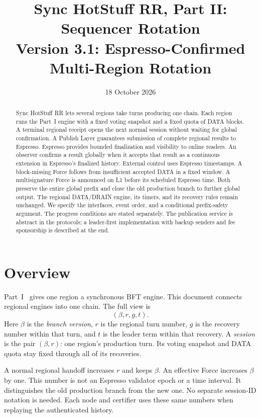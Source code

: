 \documentclass[11pt,a4paper]{article}
\title{Sync HotStuff RR, Part II: Sequencer Rotation\\\large Version 3.1: Espresso-Confirmed Multi-Region Rotation}
\author{}\date{18 October 2026}
\newcommand{\defterm}[1]{\textcolor{rrBlue}{\textit{#1}}}
\newcounter{protocol}
\begin{document}
\maketitle
\begin{abstract}
Sync HotStuff RR lets several regions take turns producing one chain.
Each region runs the Part~I engine with a fixed voting snapshot and a
fixed quota of DATA blocks. A terminal regional receipt opens the next
normal session without waiting for global confirmation. A Publish Layer
guarantees submission of complete regional results to Espresso. Espresso
provides bounded finalization and visibility to online readers. An observer confirms a result
globally when it accepts that result as a continuous extension in
Espresso's finalized history. External control uses Espresso timestamps.
A block-missing Force follows from insufficient accepted DATA in a fixed
window. A multisignature Force is announced on L1 before its scheduled
Espresso time. Both preserve the entire global prefix and close the old
production branch to further global output. The regional DATA/DRAIN
engine, its timers, and its recovery rules remain unchanged. We specify
the interfaces, event order, and a conditional prefix-safety argument.
The progress conditions are stated separately. The publication service is
abstract in the protocols; a leader-first implementation with backup
senders and fee sponsorship is described at the end.
\end{abstract}

\section{Overview}
\label{sec:overview}
Part~I~\cite{part1} gives one region a synchronous BFT engine.
This document connects regional engines into one chain. The full view is
\[
 (\beta,r,g,t).
\]
Here $\beta$ is the \defterm{branch version}, $r$ is the regional turn
number, $g$ is the recovery number within that turn, and $t$ is the
leader term within that recovery. A \defterm{session} is the pair
$(\beta,r)$: one region's production turn. Its voting snapshot and DATA
quota stay fixed through all of its recoveries.

A normal regional handoff increases $r$ and keeps $\beta$.
An effective Force increases $\beta$ by one. This number is not an
Espresso validator epoch or a time interval. It distinguishes the old
production branch from the new one. No separate session-ID notation is
needed. Each node and certifier uses these same numbers when replaying
the authenticated history.
\end{document}
